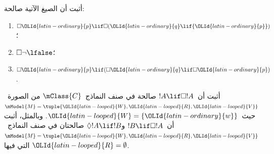\documentclass[../../../include/open-logic-section]{subfiles}
\begin{document}
\begin{prob}
  أثبت أن الصيغ الآتية صالحة:
  \begin{enumerate}
  \item $\Box {\OLId{latin-ordinary}{p}} \lif \Box ({\OLId{latin-ordinary}{q}} \lif {\OLId{latin-ordinary}{p}})$؛
  \item $\Box \lnot \lfalse$؛
  \item $\Box {\OLId{latin-ordinary}{p}} \lif (\Box {\OLId{latin-ordinary}{q}} \lif \Box {\OLId{latin-ordinary}{p}})$.
  \end{enumerate}
\end{prob}

\begin{prob}
  أثبت أن~$!A \lif \Box!A$ صالحة في صنف النماذج~$\mClass{C}$ من
  الصورة~$\mModel{M} = \tuple{{\OLId{latin-looped}{W}}, {\OLId{latin-looped}{R}}, {\OLId{latin-looped}{V}}}$ حيث~${\OLId{latin-looped}{W}} = \{{\OLId{latin-ordinary}{w}}\}$. وبالمثل،
  أثبت أن~$!B \lif \Box !A$ و$\Diamond !A \lif !B$ صالحتان في صنف
  النماذج~$\mModel{M} = \tuple{{\OLId{latin-looped}{W}}, {\OLId{latin-looped}{R}}, {\OLId{latin-looped}{V}}}$ التي فيها
  ${\OLId{latin-looped}{R}} = \emptyset$.
\end{prob}
\end{document}
